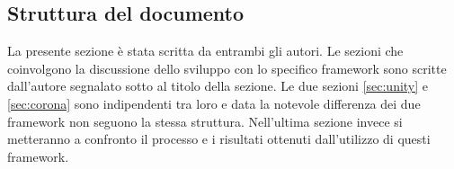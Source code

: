		
	\subsection{Struttura del documento}
		La presente sezione è stata scritta da entrambi gli autori. Le sezioni che coinvolgono la discussione dello sviluppo con lo specifico framework sono scritte dall'autore segnalato sotto al titolo della sezione. Le due sezioni \ref{sec:unity} e \ref{sec:corona} sono indipendenti tra loro e data la notevole differenza dei due framework non seguono la stessa struttura. Nell'ultima sezione invece si metteranno a confronto il processo e i risultati ottenuti dall'utilizzo di questi framework.
	
	